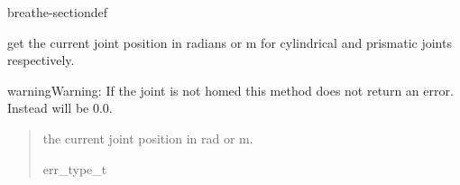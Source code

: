\documentclass[letterpaper,10pt,english]{sphinxmanual}
\begin{document}
\begin{fulllineitems}
\begin{sphinxuseclass}{breathe-sectiondef}
\begin{fulllineitems}
\label{\detokenize{code/bioscara_hardware_drivers/index:_CPPv4N25bioscara_hardware_drivers25bioscara_hardware_drivers9MockJoint11getPositionERf}}\label{\detokenize{code/bioscara_hardware_drivers/index:_CPPv3N25bioscara_hardware_drivers25bioscara_hardware_drivers9MockJoint11getPositionERf}}\label{\detokenize{code/bioscara_hardware_drivers/index:_CPPv2N25bioscara_hardware_drivers25bioscara_hardware_drivers9MockJoint11getPositionERf}}\label{\detokenize{code/bioscara_hardware_drivers/index:bioscara_hardware_drivers::bioscara_hardware_drivers::MockJoint::getPosition__floatR}}
\pysigstartsignatures
\pysigstartmultiline
\pysiglinewithargsret
{\label{\detokenize{code/bioscara_hardware_drivers/index:classbioscara__hardware__drivers_1_1MockJoint_1a669f5d39cc8e67155bf2774d204d3e81}}}
{}
{}
\pysigstopmultiline
\pysigstopsignatures
\sphinxAtStartPar
get the current joint position in radians or m for cylindrical and prismatic joints respectively. 

\begin{sphinxadmonition}{warning}{Warning:}
\sphinxAtStartPar
If the joint is not homed this method does not return an error. Instead  will be 0.0.
\end{sphinxadmonition}
\begin{quote}\begin{description}
\sphinxAtStartPar
{} \textendash{} the current joint position in rad or m. 

\sphinxAtStartPar
err\_type\_t 

\end{description}\end{quote}

\end{fulllineitems}



\end{sphinxuseclass}
\end{fulllineitems}
\end{document}
